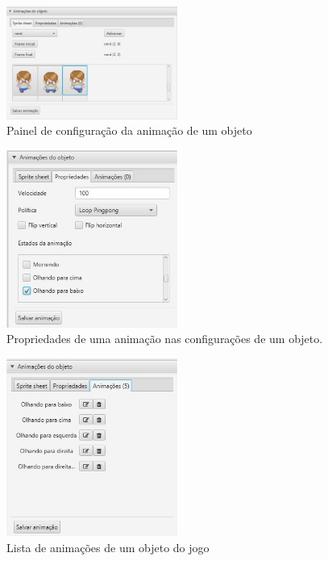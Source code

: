 \documentclass[12pt,oneside,openright,a4paper,english,brazil,sumario=tradicional]{abntex2}
\begin{document}
\begin{anexosenv}
   \begin{figure}[H]
   \centering
   \includegraphics[width=0.5\textwidth]{images/anima_obj.jpg}
   \caption{Painel de configuração da animação de um objeto}
   \label{fig:anima_obj}
   \end{figure}

   \begin{figure}[H]
   \centering
   \includegraphics[width=0.5\textwidth]{images/anima_props.jpg}
   \caption{Propriedades de uma animação nas configurações de um objeto.}
   \label{fig:anima_props}
   \end{figure}

   \begin{figure}[H]
   \centering
   \includegraphics[width=0.5\textwidth]{images/anima_lista.jpg}
   \caption{Lista de animações de um objeto do jogo}
   \label{fig:anima_lista}
   \end{figure}


\end{anexosenv}
\end{document}
